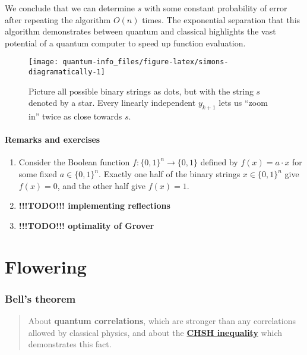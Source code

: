 \documentclass[fleqn]{article}
\providecommand{\tightlist}{%
  \setlength{\itemsep}{0pt}\setlength{\parskip}{0pt}}
\let\oldsection\section
\renewcommand\section{\clearpage\oldsection}
\let\oldpart\part
\renewcommand\part{\clearpage\oldpart}
\begin{document}
We conclude that we can determine \(s\) with some constant probability of error after repeating the algorithm \(O(n)\) times.
The exponential separation that this algorithm demonstrates between quantum and classical highlights the vast potential of a quantum computer to speed up function evaluation.



\begin{figure}[H]

{\centering \texttt{[image: quantum-info\_files/figure-latex/simons-diagramatically-1]} 

}

\caption{Picture all possible binary strings as dots, but with the string \(s\) denoted by a star. Every linearly independent \(y_{k+1}\) lets us ``zoom in'' twice as close towards \(s\).}\label{fig:simons-diagramatically}
\end{figure}

\hypertarget{remarks-and-exercises-2}{%
\subsection{Remarks and exercises}\label{remarks-and-exercises-2}}

\begin{enumerate}
\def\labelenumi{\arabic{enumi}.}
\tightlist
\item
  Consider the Boolean function \(f\colon\{0,1\}^n\to\{0,1\}\) defined by \(f(x) = a\cdot x\) for some fixed \(a\in\{0,1\}^n\).
  Exactly one half of the binary strings \(x\in\{0,1\}^n\) give \(f(x)=0\), and the other half give \(f(x)=1\).
\item
  \textbf{!!!TODO!!! implementing reflections}
\item
  \textbf{!!!TODO!!! optimality of Grover}
\end{enumerate}

\hypertarget{part-flowering}{%
\part{Flowering}\label{part-flowering}}

\hypertarget{chapter7}{%
\section{Bell's theorem}\label{chapter7}}

\begin{quote}
About \textbf{quantum correlations}, which are stronger than any correlations allowed by classical physics, and about the \href{https://en.wikipedia.org/wiki/CHSH_inequality}{\textbf{CHSH inequality}} which demonstrates this fact.
\end{quote}
\end{document}
